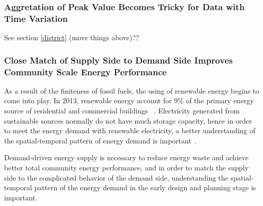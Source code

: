 \documentclass[hidelinks,12pt]{article}
\newcommand{\grey}[1]{\textcolor{black!30}{#1}}
\begin{document}
\subsubsection{Aggretation of Peak Value Becomes Tricky for Data with Time Variation}
See section \ref{district}
\grey{(move things above)??}

\begin{comment}
\subsubsection{Temporal variation of the Supply Side}
The commonly used renewable energy source includes: solar, wind,
geothermal, hydropower and biomass. Among these sources, solar energy
have strong temporal fluctuation as a result of the temporal variation
of solar radiation between different hours of a year and the time of
year~\cite{EIARenewable2015}. There is also a cost difference involved
in the electricity supply.
\end{comment}

\subsubsection{Close Match of Supply Side to Demand Side Improves
  Community Scale Energy Performance}
As a result of the finiteness of fossil fuels, the using of renewable
energy begins to come into play. In 2013, renewable energy account for
9\% of the primary energy source of residential and commercial
buildings ~\cite{EIAPrimary2013}. Electricity generated from
sustainable sources normally do not have much storage capacity, hence
in order to meet the energy demand with renewable electricity, a
better understanding of the spatial-temporal pattern of energy demand
is important~\cite{Mikkola2014256}.

Demand-driven energy supply is necessary to reduce energy waste and
achieve better total community energy performance, and in order to
match the supply side to the complicated behavior of the demand side,
understanding the spatial-temporal pattern of the energy demand 
in the early design and planning stage is important. 
\end{document}

